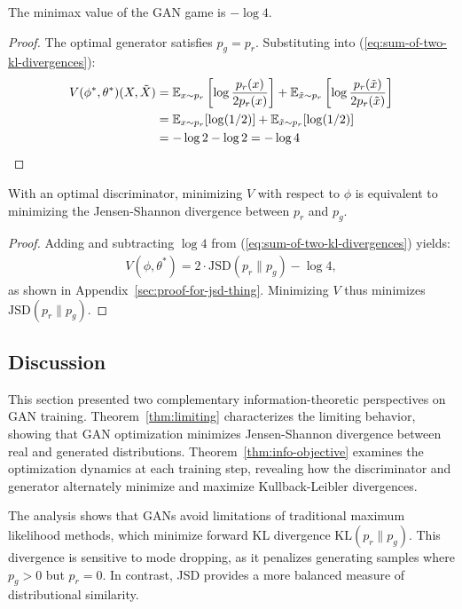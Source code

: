 \begin{lemma}
	The minimax value of the GAN game is $-\log 4$.
\end{lemma}
\begin{proof}
	The optimal generator satisfies $p_g = p_r$. Substituting into (\ref{eq:sum-of-two-kl-divergences}):
	\begin{align}
		V(\phi^*, \theta^*)(X, \tilde{X}) & = \mathbb{E}_{x \sim p_r}\left[\log{p_r(x) \over 2p_r(x)}\right] + \mathbb{E}_{\tilde{x} \sim p_r}\left[\log{p_r(\tilde{x}) \over 2p_r(\tilde{x})}\right] \\
		                                  & = \mathbb{E}_{x \sim p_r}[\log(1/2)] + \mathbb{E}_{\tilde{x} \sim p_r}[\log(1/2)]                                                                         \\
		                                  & = -\log 2 - \log 2 = -\log 4
	\end{align}
\end{proof}

\begin{theorem}%
	\label{thm:limiting}
	With an optimal discriminator, minimizing $V$ with respect to $\phi$ is equivalent to minimizing the Jensen-Shannon divergence between $p_r$ and $p_g$.
\end{theorem}
\begin{proof}
	Adding and subtracting $\log 4$ from (\ref{eq:sum-of-two-kl-divergences}) yields:
	\begin{align}
		\label{eq:desired}
		V(\phi, \theta^*) = 2 \cdot \text{JSD}(p_r \| p_g) - \log 4,
	\end{align}
	as shown in Appendix~\ref{sec:proof-for-jsd-thing}. Minimizing $V$ thus minimizes $\text{JSD}(p_r \| p_g)$.
\end{proof}

\subsection{Discussion}
This section presented two complementary information-theoretic perspectives on GAN training. Theorem~\ref{thm:limiting} characterizes the limiting behavior, showing that GAN optimization minimizes Jensen-Shannon divergence between real and generated distributions. Theorem~\ref{thm:info-objective} examines the optimization dynamics at each training step, revealing how the discriminator and generator alternately minimize and maximize Kullback-Leibler divergences.

The analysis shows that GANs avoid limitations of traditional maximum likelihood methods, which minimize forward KL divergence $\text{KL}(p_r \| p_g)$. This divergence is sensitive to mode dropping, as it penalizes generating samples where $p_g > 0$ but $p_r = 0$. In contrast, JSD provides a more balanced measure of distributional similarity.

